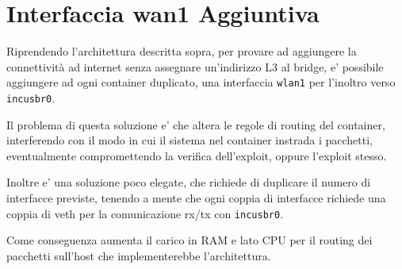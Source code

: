 \section{Interfaccia wan1 Aggiuntiva}\label{interfaccia-wan1-aggiuntiva}

Riprendendo l'architettura descritta sopra, per provare ad aggiungere la
connettività ad internet senza assegnare un'indirizzo L3 al bridge, e'
possibile aggiungere ad ogni container duplicato, una interfaccia
\passthrough{\lstinline!wlan1!} per l'inoltro verso
\passthrough{\lstinline!incusbr0!}.

Il problema di questa soluzione e' che altera le regole di routing del
container, interferendo con il modo in cui il sistema nel container
instrada i pacchetti, eventualmente compromettendo la verifica
dell'exploit, oppure l'exploit stesso.

Inoltre e' una soluzione poco elegate, che richiede di duplicare il
numero di interfacce previste, tenendo a mente che ogni coppia di
interfacce richiede una coppia di veth per la comunicazione rx/tx con
\passthrough{\lstinline!incusbr0!}.

Come conseguenza aumenta il carico in RAM e lato CPU per il routing dei
pacchetti sull'host che implementerebbe l'architettura.
